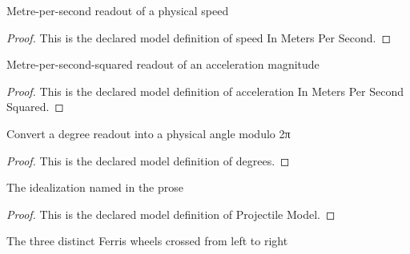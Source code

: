 \begin{definition}
  \label{def:physics:phyx-mini-0743:phyxminiproblems-problemphyxmini0743-speedinmeterspersecond}
  Metre-per-second readout of a physical speed
\end{definition}
\begin{proof}
  This is the declared model definition of speed In Meters Per Second.
\end{proof}
\begin{definition}
  \label{def:physics:phyx-mini-0743:phyxminiproblems-problemphyxmini0743-accelerationinmeterspersecondsquared}
  Metre-per-second-squared readout of an acceleration magnitude
\end{definition}
\begin{proof}
  This is the declared model definition of acceleration In Meters Per Second Squared.
\end{proof}
\begin{definition}[degrees]
  \label{def:physics:phyx-mini-0743:phyxminiproblems-problemphyxmini0743-degrees}
  Convert a degree readout into a physical angle modulo 2π
\end{definition}
\begin{proof}
  This is the declared model definition of degrees.
\end{proof}
\begin{definition}
  \label{def:physics:phyx-mini-0743:phyxminiproblems-problemphyxmini0743-projectilemodel}
  The idealization named in the prose
\end{definition}
\begin{proof}
  This is the declared model definition of Projectile Model.
\end{proof}
\begin{definition}
  \label{def:physics:phyx-mini-0743:phyxminiproblems-problemphyxmini0743-ferriswheel}
  The three distinct Ferris wheels crossed from left to right
\end{definition}
